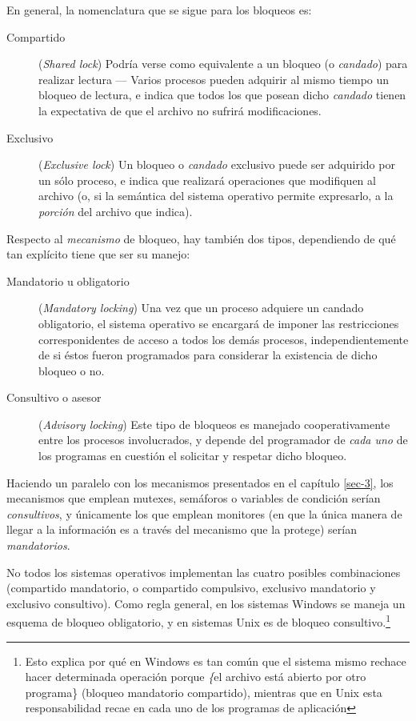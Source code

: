 \documentclass[11pt,fleqn]{book} %
\begin{document}
En general, la nomenclatura que se sigue para los bloqueos es:

\begin{description}
\item[Compartido] (\emph{Shared lock}) Podría verse como equivalente a un
                bloqueo (o \emph{candado}) para realizar lectura — Varios
                procesos pueden adquirir al mismo tiempo un bloqueo de
                lectura, e indica que todos los que posean dicho
                \emph{candado} tienen la expectativa de que el archivo no
                sufrirá modificaciones.
\item[Exclusivo] (\emph{Exclusive lock}) Un bloqueo o \emph{candado} exclusivo
               puede ser adquirido por un sólo proceso, e indica que
               realizará operaciones que modifiquen al archivo (o, si
               la semántica del sistema operativo permite expresarlo,
               a la \emph{porción} del archivo que indica).
\end{description}

Respecto al \emph{mecanismo} de bloqueo, hay también dos tipos,
dependiendo de qué tan explícito tiene que ser su manejo:

\begin{description}
\item[Mandatorio u obligatorio] (\emph{Mandatory locking}) Una vez que un
     proceso adquiere un candado obligatorio, el sistema operativo se
     encargará de imponer las restricciones corresponidentes de acceso
     a todos los demás procesos, independientemente de si éstos fueron
     programados para considerar la existencia de dicho bloqueo o no.
\item[Consultivo o asesor] (\emph{Advisory locking}) Este tipo de bloqueos
     es manejado cooperativamente entre los procesos involucrados, y
     depende del programador de \emph{cada uno} de los programas en
     cuestión el solicitar y respetar dicho bloqueo.
\end{description}

Haciendo un paralelo con los mecanismos presentados en el capítulo
\ref{sec-3}, los mecanismos que emplean
mutexes, semáforos o variables de condición serían \emph{consultivos}, y
únicamente los que emplean monitores (en que la única manera de llegar
a la información es a través del mecanismo que la protege) serían
\emph{mandatorios}.

No todos los sistemas operativos implementan las cuatro posibles combinaciones
(compartido mandatorio, o compartido compulsivo, exclusivo mandatorio
y exclusivo consultivo). Como regla general,
en los sistemas Windows se maneja un esquema de bloqueo obligatorio, y
en sistemas Unix es de bloqueo consultivo.\footnote{Esto explica por qué
en Windows es tan común que el sistema mismo rechace hacer
determinada operación porque \emph\{el archivo está abierto por otro
programa\} (bloqueo mandatorio compartido), mientras que en Unix esta
responsabilidad recae en cada uno de los programas de aplicación }
\end{document}
